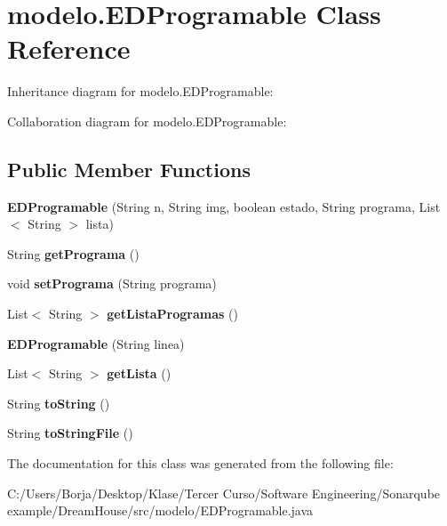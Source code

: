\hypertarget{classmodelo_1_1_e_d_programable}{}\section{modelo.\+E\+D\+Programable Class Reference}
\label{classmodelo_1_1_e_d_programable}


Inheritance diagram for modelo.\+E\+D\+Programable\+:


Collaboration diagram for modelo.\+E\+D\+Programable\+:
\subsection*{Public Member Functions}
\begin{DoxyCompactItemize}
\item 
\mbox{\label{classmodelo_1_1_e_d_programable_acdbaee3588ae86f0b3846174a3315f7f}} 
{\bfseries E\+D\+Programable} (String n, String img, boolean estado, String programa, List$<$ String $>$ lista)
\item 
\mbox{\label{classmodelo_1_1_e_d_programable_a83fc76bd8e7b38da1eaca4adf090bc51}} 
String {\bfseries get\+Programa} ()
\item 
\mbox{\label{classmodelo_1_1_e_d_programable_a17f43d67346fc47216adb631225ca70b}} 
void {\bfseries set\+Programa} (String programa)
\item 
\mbox{\label{classmodelo_1_1_e_d_programable_a4831d2cbeb888123f271c6703d50a3d0}} 
List$<$ String $>$ {\bfseries get\+Lista\+Programas} ()
\item 
\mbox{\label{classmodelo_1_1_e_d_programable_ad7b55ad5c04fd084089e5d794ed65454}} 
{\bfseries E\+D\+Programable} (String linea)
\item 
\mbox{\label{classmodelo_1_1_e_d_programable_aa12df54712ea2dfc73fbb89da595ca11}} 
List$<$ String $>$ {\bfseries get\+Lista} ()
\item 
\mbox{\label{classmodelo_1_1_e_d_programable_afc84581d73aaf75bd833fe029a5d6f33}} 
String {\bfseries to\+String} ()
\item 
\mbox{\label{classmodelo_1_1_e_d_programable_a73931112f3e7effc39bed0223efaa428}} 
String {\bfseries to\+String\+File} ()
\end{DoxyCompactItemize}


The documentation for this class was generated from the following file\+:\begin{DoxyCompactItemize}
\item 
C\+:/\+Users/\+Borja/\+Desktop/\+Klase/\+Tercer Curso/\+Software Engineering/\+Sonarqube example/\+Dream\+House/src/modelo/E\+D\+Programable.\+java\end{DoxyCompactItemize}
